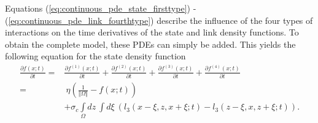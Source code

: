 Equations (\ref{eq:continuous_pde_state_firsttype}) - (\ref{eq:continuous_pde_link_fourthtype}) describe the influence of the four types of interactions on the time derivatives of the state and link density functions. To obtain the complete model, these PDEs can simply be added. This yields the following equation for the state density function
\begin{equation}
\begin{aligned}
	\frac{\partial f(x;t)}{\partial t}  
	=& \frac{\partial f^{(1)}(x;t)}{\partial t}  + \frac{\partial f^{(2)}(x;t)}{\partial t}  + \frac{\partial f^{(3)}(x;t)}{\partial t}  + \frac{\partial f^{(4)}(x;t)}{\partial t} \\
	=&\ \eta \left( \frac{1}{\Vert \Omega \Vert} - f(x;t) \right) \\
	&+  \sigma_c \int\limits_{\Omega}dz\  \int d \xi \ \left( l_3(x-\xi ,z,x+\xi ;t)  - l_3(z-\xi,x,z+\xi;t) \right)
	.
	\label{eq:continuous_pde_state_complete_w_ho_terms}
\end{aligned}
\end{equation}

\raggedbottom

